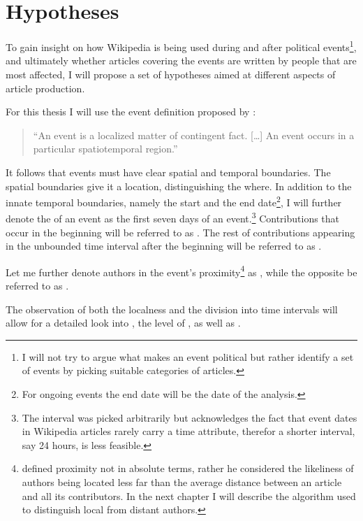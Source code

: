 \chapter{Hypotheses}\label{ch:hypotheses}

To gain insight on how Wikipedia is being used during and after political events\footnote{I will not try to argue what makes an event political but rather identify a set of events by picking suitable categories of articles.}, and ultimately whether articles covering the events are written by people that are most affected, I will propose a set of hypotheses aimed at different aspects of article production.

For this thesis I will use the event definition proposed by \textcite[243]{lewis1987philosophical}: 
\begin{quotation}
``An event is a localized matter of contingent fact. [\ldots] An event occurs in a particular spatiotemporal region.''
\end{quotation}
It follows that events must have clear spatial and temporal boundaries.
The spatial boundaries give it a location, distinguishing the where.
In addition to the innate temporal boundaries, namely the start and the end date\footnote{For ongoing events the end date will be the date of the analysis.}, I will further denote the  of an event as the first seven days of an event.\footnote{The interval was picked arbitrarily but acknowledges the fact that event dates in Wikipedia articles rarely carry a time attribute, therefor a shorter interval, say 24 hours, is less feasible.}
Contributions that occur in the beginning will be referred to as .
The rest of contributions appearing in the unbounded time interval after the beginning will be referred to as .

Let me further denote authors in the event's proximity\footnote{\textcite[57]{hardy2011volunteered} defined proximity not in absolute terms, rather he considered the likeliness of authors being located less far than the average distance between an article and all its contributors. In the next chapter  I will describe the algorithm used to distinguish local from distant authors.} as , while the opposite be referred to as .

The observation of both the localness and the division into time intervals will allow for a detailed look into , the level of , as well as .

